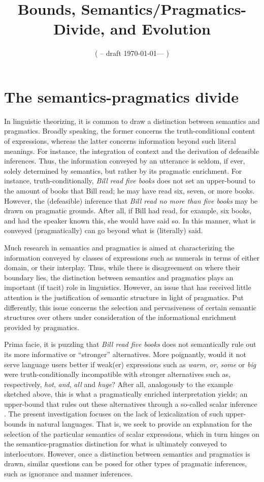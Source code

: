 \documentclass[a4paper]{article}
\title{Bounds, Semantics/Pragmatics-Divide, and Evolution}
\author{%
    ( -- draft \today --- )
}
\date{}
\begin{document}
\maketitle
\section{The semantics-pragmatics divide}\label{sec:introduction}

In linguistic theorizing, it is common to draw a distinction between semantics and pragmatics. Broadly speaking, the former concerns the truth-conditional content of expressions, whereas the latter concerns information beyond such literal meanings. For instance, the integration of context and the derivation of defeasible inferences. Thus, the information conveyed by an utterance is seldom, if ever, solely determined by semantics, but rather by its pragmatic enrichment. For instance, truth-conditionally, {\em Bill read five books} does not set an upper-bound to the amount of books that Bill read; he may have read six, seven, or more books. However, the (defeasible) inference that {\em Bill read no more than five books} may be drawn on pragmatic grounds. After all, if Bill had read, for example, six books, and had the speaker known this, she would have said so. In this manner, what is conveyed (pragmatically) can go beyond what is (literally) said. 


Much research in semantics and pragmatics is aimed at characterizing the information conveyed by classes of expressions such as numerals in terms of either domain, or their interplay. Thus, while there is disagreement on where their boundary lies, the distinction between semantics and pragmatics plays an important (if tacit) role in linguistics. However, an issue that has received little attention is the justification of semantic structure in light of pragmatics. Put differently, this issue concerns the selection and pervasiveness of certain semantic structures over others under consideration of the informational enrichment provided by pragmatics. 

Prima facie, it is puzzling that {\em Bill read five books} does not semantically rule out its more informative or ``stronger'' alternatives. More poignantly, would it not serve language users better if weak(er) expressions such as {\em warm}, {\em or}, {\em some} or {\em big} were truth-conditionally incompatible with stronger alternatives such as, respectively, {\em hot}, {\em and}, {\em all} and {\em huge}? After all, analogously to the example sketched above, this is what a pragmatically enriched interpretation yields; an upper-bound that rules out these alternatives through a so-called scalar inference \citep{horn:1972,gazdar:1979}. The present investigation focuses on the lack of lexicalization of such upper-bounds in natural languages. That is, we seek to provide an explanation for the selection of the particular semantics of scalar expressions, which in turn hinges on the semantics-pragmatics distinction for what is ultimately conveyed to interlocutors. However, once a distinction between semantics and pragmatics is drawn, similar questions can be posed for other types of pragmatic inferences, such as ignorance and manner inferences. 
\end{document}
